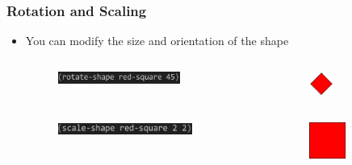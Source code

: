 \documentclass{beamer}
\begin{document}
\begin{frame}[fragile]
\frametitle{Rotation and Scaling}
	\begin{itemize}
	\item You can modify the size and orientation of the shape
	\begin{columns}[t]
		\begin{column}{.45\textwidth}
			\begin{figure}[h]
				\hspace{0.25cm}
			\includegraphics[width=4cm]{PresentationImages/rotateRedCode.png}
			\end{figure}
		\end{column}
		\begin{column}{.3\textwidth}
			\begin{figure}[h]
			\includegraphics[width=0.8cm]{PresentationImages/red-rectangle-rotate.png}
			\end{figure}		
		\end{column}
		\end{columns}
		
		\begin{columns}[t]
		\begin{column}{.45\textwidth}
			\begin{figure}[h]
			\hspace{0.25cm}
			\includegraphics[width=4.4cm]{PresentationImages/scaleRedCode.png}
			\end{figure}
		\end{column}
		\begin{column}{.3\textwidth}
			\begin{figure}[h]
			\includegraphics[width=1.2cm]{PresentationImages/red-rectangle-scale.png}
			\end{figure}		
		\end{column}
		\end{columns}
		

\end{itemize}
\end{frame}
\end{document}
